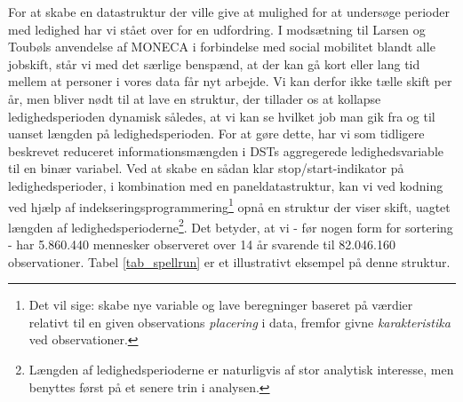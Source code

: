 For at skabe en datastruktur der ville give at mulighed for at undersøge perioder med ledighed har vi stået over for en udfordring. I modsætning til Larsen og Toubøls anvendelse af MONECA i forbindelse med social mobilitet blandt alle jobskift, står vi med det særlige benspænd, at der kan gå kort eller lang tid mellem at personer i vores data får nyt arbejde. Vi kan derfor ikke tælle skift per år, men bliver nødt til at lave en struktur, der tillader os at kollapse ledighedsperioden dynamisk således, at vi kan se hvilket job man gik fra og til uanset længden på ledighedsperioden. For at gøre dette, har vi som tidligere beskrevet reduceret informationsmængden i DSTs aggregerede ledighedsvariable til en binær variabel. Ved at skabe en sådan klar stop/start-indikator på ledighedsperioder, i kombination med en paneldatastruktur, kan vi ved kodning ved hjælp af indekseringsprogrammering\footnote{Det vil sige: skabe nye variable og lave beregninger baseret på værdier relativt til en given observations \emph{placering} i data, fremfor givne \emph{karakteristika} ved observationer.} opnå en struktur der viser skift, uagtet længden af ledighedsperioderne\footnote{Længden af ledighedsperioderne er naturligvis af stor analytisk interesse, men benyttes først på et senere trin i analysen.}. Det betyder, at vi - før nogen form for sortering - har 5.860.440 mennesker observeret over 14 år svarende til 82.046.160 observationer. Tabel \ref{tab_spellrun} er et illustrativt eksempel på denne struktur. 
%
